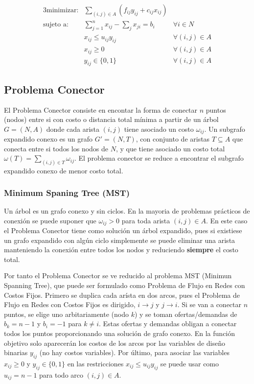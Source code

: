 \begin{alignat}{3}
    \text{minimizar:}   & \sum_{(i,j)\in A}(f_{ij}y_{ij} + c_{ij}x_{ij})    &                       \\
    \text{sujeto a:}    & \sum_{j=1}^nx_{ij}-\sum_{j}x_{ji}=b_i                 & \forall i\in N        \\
                        & x_{ij}\leq u_{ij}y_{ij}                           & \forall (i,j)\in A    \\
                        & x_{ij}\geq 0                                      & \forall (i,j)\in A    \\
                        & y_{ij}\in\{0,1\}                                  & \forall (i,j)\in A
\end{alignat}

\subsection{Problema Conector}

El Problema Conector consiste en encontar la forma de conectar $n$ puntos (nodos) entre si con costo o distancia total mínima 
a partir de un árbol $G=(N,A)$ donde cada arista $(i,j)$ tiene asociado un costo $\omega_{ij}$. Un subgrafo expandido conexo 
es un grafo $G'=(N,T)$, con conjunto de aristas $T\subseteq A$ que conecta entre si todos los nodos de $N$, y que tiene 
asociado un costo total $\omega(T)=\sum_{(i,j)\in T}\omega_{ij}$. El problema conector se reduce a encontrar el subgrafo 
expandido conexo de menor costo total.

\subsubsection{Minimum Spaning Tree (MST)}

Un árbol es un grafo conexo y sin ciclos. En la mayoria de problemas prácticos de conexión se puede suponer que 
$\omega_{ij}>0$ para toda arista $(i,j)\in A$. En este caso el Problema Conector tiene como solución un árbol expandido,
pues si existiese un grafo expandido con algún ciclo simplemente se puede eliminar una arista manteniendo la conexión entre
todos los nodos y reduciendo \textbf{siempre} el costo total. 

Por tanto el Problema Conector se ve reducido al problema MST (Minimun Spanning Tree), que puede ser formulado como Problema 
de Flujo en Redes con Costos Fijos. Primero se duplica cada arísta en dos arcos, pues el Problema de Flujo en Redes con Costos
Fijos es dirigido, $i\to j$ y $j\to i$. Si se van a conectar $n$ puntos, se elige uno arbitariamente (nodo $k$) y se toman 
ofertas/demandas de $b_k=n-1$ y $b_i=-1$ para $k\neq i$. Estas ofertas y demandas obligan a conectar todos los puntos 
proporcionando una solución de grafo conexo. En la función objetivo solo aparecerán los costos de los arcos por las variables 
de diseño binarias $y_{ij}$ (no hay costos variables). Por último, para asociar las variables 
$x_{ij}\geq 0$ y $y_{ij}\in\{0,1\}$ en las restricciones $x_{ij}\leq u_{ij}y_{ij}$ se puede usar como $u_{ij}=n-1$ para todo 
arco $(i,j)\in A$.

